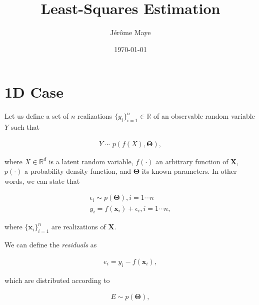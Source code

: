 \documentclass[12pt]{article}
\title{Least-Squares Estimation}
\author{J\'{e}r\^{o}me Maye}
\date{\today}
\begin{document}
  \maketitle

  \section{1D Case}
    Let us define a set of $n$ realizations $\{y_i\}_{i=1}^n\in\mathbb{R}$ of an
    observable random variable $Y$ such that

    \begin{equation}\label{eqn:model1d}
      \begin{aligned}
        Y \sim p(f(X),\boldsymbol{\Theta}),
      \end{aligned}
    \end{equation}

    \noindent where $X\in\mathbb{R}^d$ is a latent random variable, $f(\cdot)$
    an arbitrary function of $\mathbf{X}$, $p(\cdot)$ a probability density
    function, and $\boldsymbol{\Theta}$ its known parameters. In other words, we
    can state that

    \begin{equation}\label{eqn:model1dreal}
      \begin{aligned}
        \epsilon_i \sim p(\boldsymbol{\Theta}), i = 1\cdots n\\
        y_i = f(\mathbf{x}_i) + \epsilon_i, i=1\cdots n,
      \end{aligned}
    \end{equation}

    \noindent where $\{\mathbf{x}_i\}_{i=1}^n$ are realizations of $\mathbf{X}$.

    We can define the \emph{residuals} as

    \begin{equation}\label{eqn:model1dres}
      \begin{aligned}
      e_i = y_i - f(\mathbf{x}_i),
      \end{aligned}
    \end{equation}

    \noindent which are distributed according to

    \begin{equation}\label{eqn:model1dresdist}
      \begin{aligned}
      E \sim p(\boldsymbol{\Theta}),
      \end{aligned}
    \end{equation}
\end{document}
